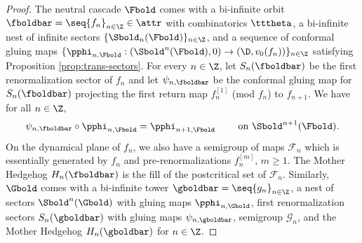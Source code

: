 \documentclass{amsart}
\begin{document}
\begin{proof}
    The neutral cascade $\Fbold$ comes with a bi-infinite orbit $\fboldbar = \seq{f_n}_{n\in\Z} \in \attr$ with combinatorics $\tttheta$, a bi-infinite nest of infinite sectors $\{\Sbold_{n}(\Fbold)\}_{n\in \Z}$, and a sequence of conformal gluing maps $\{ \pphi_{n,\Fbold}: (\Sbold^n(\Fbold),0) \to (\D, v_0(f_n)) \}_{n\in\Z}$ satisfying Proposition \ref{prop:trans-sectors}.
    For every $n \in \Z$, let $S_{n}(\fboldbar)$ be the first renormalization sector of $f_n$ and let $\psi_{n,\fboldbar}$ be the conformal gluing map for $S_{n}(\fboldbar)$ projecting the first return map $f_n^{[1]}$ (mod $f_n$) to $f_{n+1}$.
    We have for all $n \in \Z$, 
    \[
    \psi_{n,\fboldbar} \circ \pphi_{n,\Fbold} = \pphi_{n+1,\Fbold} \qquad \text{ on } \Sbold^{n+1}(\Fbold).
    \]
    On the dynamical plane of $f_n$, we also have a semigroup of maps $\mathcal{F}_n$ which is essentially generated by $f_n$ and pre-renormalizations $f_n^{[m]}$, $m \geq 1$.
    The Mother Hedgehog $H_n(\fboldbar)$ is the fill of the postcritical set of $\mathcal{F}_n$.
    Similarly, $\Gbold$ comes with a bi-infinite tower $\gboldbar = \seq{g_n}_{n\in\Z}$, a nest of sectors $\Sbold^n(\Gbold)$ with gluing maps $\pphi_{n,\Gbold}$, first renormalization sectors $S_{n}(\gboldbar)$ with gluing maps $\psi_{n,\gboldbar}$, semigroup $\mathcal{G}_n$, and the Mother Hedgehog $H_n(\gboldbar)$ for $n \in \Z$.


\end{proof}
\end{document}
